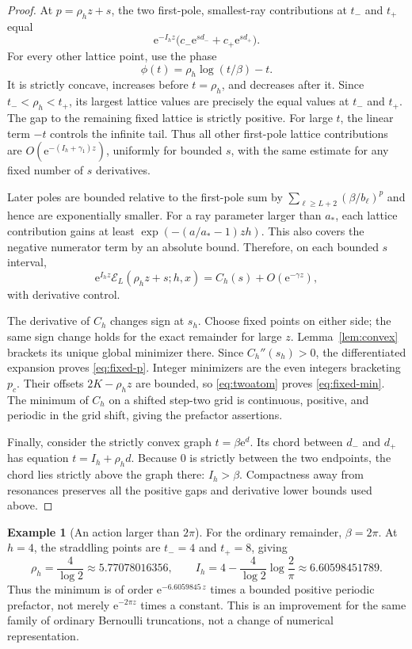 \documentclass[11pt,a4paper]{article}
\numberwithin{equation}{section}
\theoremstyle{definition}\newtheorem{definition}[theorem]{Definition}
\newtheorem{example}[theorem]{Example}
\theoremstyle{remark}\newtheorem{remark}[theorem]{Remark}
\newcommand{\e}{\mathrm e}
\newcommand{\astar}{a_*}
\newcommand{\calE}{\mathcal E}
\begin{document}
\begin{proof}
At $p=\rho_hz+s$, the two first-pole, smallest-ray contributions at
$t_-$ and $t_+$ equal
\[
 \e^{-I_hz}\bigl(c_-\e^{sd_-}+c_+\e^{sd_+}\bigr).
\]
For every other lattice point, use the phase
\[
 \phi(t)=\rho_h\log(t/\beta)-t.
\]
It is strictly concave, increases before $t=\rho_h$, and decreases after
it. Since $t_-<\rho_h<t_+$, its largest lattice values are precisely the
equal values at $t_-$ and $t_+$. The gap to the remaining fixed lattice is
strictly positive. For large $t$, the linear term $-t$ controls the infinite
tail. Thus all other first-pole lattice contributions are
$O(\e^{-(I_h+\gamma_1)z})$, uniformly for bounded $s$, with the same
estimate for any fixed number of $s$ derivatives.

Later poles are bounded relative to the first-pole sum by
$\sum_{\ell\ge L+2}(\beta/b_\ell)^p$ and hence are exponentially smaller.
For a ray parameter larger than $\astar$, each lattice contribution gains
at least $\exp(-(a/\astar-1)zh)$. This also covers the negative numerator
term by an absolute bound. Therefore, on each bounded $s$ interval,
\begin{equation}
 \e^{I_hz}\calE_L(\rho_hz+s;h,x)
       =C_h(s)+O(\e^{-\gamma z}),
 \label{eq:twoatom}
\end{equation}
with derivative control.

The derivative of $C_h$ changes sign at $s_h$. Choose fixed points on
either side; the same sign change holds for the exact remainder for large
$z$. Lemma~\ref{lem:convex} brackets its unique global minimizer there.
Since $C_h''(s_h)>0$, the differentiated expansion proves
\eqref{eq:fixed-p}. Integer minimizers are the even integers bracketing
$p_c$. Their offsets $2K-\rho_hz$ are bounded, so \eqref{eq:twoatom}
proves \eqref{eq:fixed-min}. The minimum of $C_h$ on a shifted step-two
grid is continuous, positive, and periodic in the grid shift, giving the
prefactor assertions.

Finally, consider the strictly convex graph $t=\beta\e^d$. Its chord
between $d_-$ and $d_+$ has equation $t=I_h+\rho_h d$.
Because $0$ is strictly between the two endpoints, the chord lies strictly
above the graph there: $I_h>\beta$. Compactness away from resonances
preserves all the positive gaps and derivative lower bounds used above.
\end{proof}

\begin{example}[An action larger than $2\pi$]
For the ordinary remainder, $\beta=2\pi$. At $h=4$, the straddling points
are $t_-=4$ and $t_+=8$, giving
\[
 \rho_h=\frac4{\log2}\approx5.77078016356,
 \qquad I_h=4-\frac4{\log2}\log\frac2\pi
             \approx6.60598451789.
\]
Thus the minimum is of order $\e^{-6.6059845\,z}$ times a bounded positive
periodic prefactor, not merely $\e^{-2\pi z}$ times a constant.
This is an improvement for the same family of ordinary Bernoulli
truncations, not a change of numerical representation.
\end{example}
\end{document}
